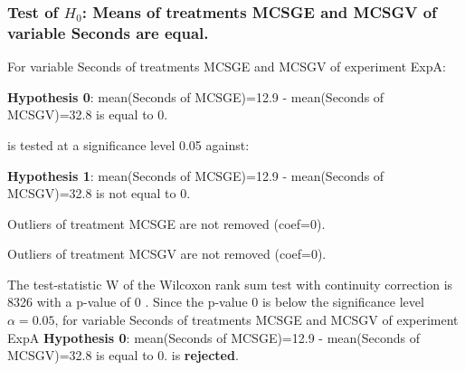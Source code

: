 \begin{frame}[t]
 \frametitle{Test of $H_{0}$: Means of treatments MCSGE and MCSGV of variable Seconds are equal. }
 \scriptsize
 For variable Seconds of treatments MCSGE and MCSGV of experiment ExpA:

\vspace{1mm}
{\bf Hypothesis 0}: mean(Seconds of MCSGE)=12.9 - mean(Seconds of MCSGV)=32.8 is equal to 0.


 \begin{center} is tested at a significance level 0.05 against: \end{center}

{\bf Hypothesis 1}: mean(Seconds of MCSGE)=12.9 - mean(Seconds of MCSGV)=32.8 is not equal to 0.
\vspace{1mm}
\vspace{1mm}

 Outliers of treatment MCSGE  are not removed (coef=0).

 Outliers of treatment MCSGV  are not removed (coef=0).
\vspace{1mm}
 
 The test-statistic W of the Wilcoxon rank sum test with continuity correction is 8326 with a p-value of 0 .
 Since the p-value 0 is below the significance level $\alpha= 0.05 $,
 for variable Seconds of treatments MCSGE and MCSGV of experiment ExpA 
 {\bf Hypothesis 0}: mean(Seconds of MCSGE)=12.9 - mean(Seconds of MCSGV)=32.8 is equal to 0.
is {\bf rejected}.

 \end{frame}

